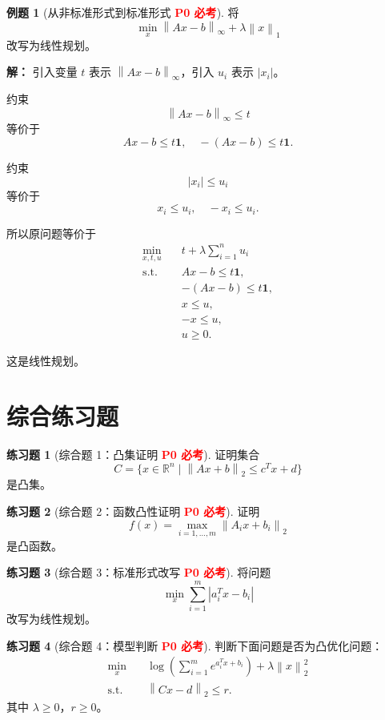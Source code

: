 \documentclass[11pt,a4paper]{ctexart}
\newcommand{\R}{\mathbb{R}}
\newcommand{\st}{\text{s.t.}}
\newcommand{\norm}[1]{\left\lVert #1 \right\rVert}
\newcommand{\Pzero}{\textcolor{red}{\textbf{P0 必考}}}
\theoremstyle{definition}
\newtheorem{example}{例题}[section]
\newtheorem{exercise}{练习题}[section]
\theoremstyle{plain}
\theoremstyle{remark}
\begin{document}
\begin{example}[从非标准形式到标准形式 \Pzero]
将
\[
    \min_x \norm{Ax-b}_\infty+\lambda\norm{x}_1
\]
改写为线性规划。

\textbf{解：}
引入变量 $t$ 表示 $\norm{Ax-b}_\infty$，引入 $u_i$ 表示 $|x_i|$。

约束
\[
    \norm{Ax-b}_\infty\le t
\]
等价于
\[
    Ax-b\le t\mathbf{1},
    \quad
    -(Ax-b)\le t\mathbf{1}.
\]

约束
\[
    |x_i|\le u_i
\]
等价于
\[
    x_i\le u_i,\quad -x_i\le u_i.
\]

所以原问题等价于
\[
\begin{aligned}
    \min_{x,t,u}\quad &
    t+\lambda\sum_{i=1}^n u_i\\
    \st\quad &
    Ax-b\le t\mathbf{1},\\
    & -(Ax-b)\le t\mathbf{1},\\
    & x\le u,\\
    & -x\le u,\\
    & u\ge0.
\end{aligned}
\]

这是线性规划。
\end{example}

\newpage

\section{综合练习题}

\begin{exercise}[综合题 1：凸集证明 \Pzero]
证明集合
\[
    C=\{x\in\R^n\mid \norm{Ax+b}_2\le c^Tx+d\}
\]
是凸集。
\end{exercise}

\begin{exercise}[综合题 2：函数凸性证明 \Pzero]
证明
\[
    f(x)=\max_{i=1,\dots,m}\norm{A_ix+b_i}_2
\]
是凸函数。
\end{exercise}

\begin{exercise}[综合题 3：标准形式改写 \Pzero]
将问题
\[
    \min_x \sum_{i=1}^m |a_i^Tx-b_i|
\]
改写为线性规划。
\end{exercise}

\begin{exercise}[综合题 4：模型判断 \Pzero]
判断下面问题是否为凸优化问题：
\[
\begin{aligned}
    \min_x\quad &
    \log\left(\sum_{i=1}^m e^{a_i^Tx+b_i}\right)
    +
    \lambda\norm{x}_2^2\\
    \st\quad &
    \norm{Cx-d}_2\le r.
\end{aligned}
\]
其中 $\lambda\ge0$，$r\ge0$。
\end{exercise}
\end{document}
